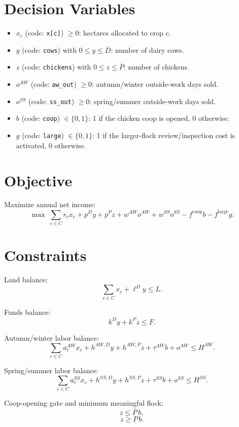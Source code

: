 \section*{Decision Variables}

\begin{itemize}
\item \(x_c\) (code: \texttt{x[c]}) \(\ge 0\): hectares allocated to crop \(c\).
\item \(y\) (code: \texttt{cows}) with \(0 \le y \le \overline D\): number of dairy cows.
\item \(z\) (code: \texttt{chickens}) with \(0 \le z \le \overline P\): number of chickens.
\item \(o^{AW}\) (code: \texttt{aw\_out}) \(\ge 0\): autumn/winter outside-work days sold.
\item \(o^{SS}\) (code: \texttt{ss\_out}) \(\ge 0\): spring/summer outside-work days sold.
\item \(b\) (code: \texttt{coop}) \(\in \{0,1\}\): 1 if the chicken coop is opened, 0 otherwise.
\item \(g\) (code: \texttt{large}) \(\in \{0,1\}\): 1 if the larger-flock review/inspection cost is activated, 0 otherwise.
\end{itemize}

\section*{Objective}

Maximize annual net income:
\[
\max \;
\sum_{c\in C} r_c x_c
+ p^D y
+ p^P z
+ w^{AW} o^{AW}
+ w^{SS} o^{SS}
- f^{\text{coop}} b
- f^{\text{large}} g .
\]

\section*{Constraints}

Land balance:
\[
\sum_{c\in C} x_c + \ell^D y \le L .
\]

Funds balance:
\[
k^D y + k^P z \le F .
\]

Autumn/winter labor balance:
\[
\sum_{c\in C} a^{AW}_c x_c
+ h^{AW,D} y
+ h^{AW,P} z
+ \tau^{AW} b
+ o^{AW}
\le H^{AW}.
\]

Spring/summer labor balance:
\[
\sum_{c\in C} a^{SS}_c x_c
+ h^{SS,D} y
+ h^{SS,P} z
+ \tau^{SS} b
+ o^{SS}
\le H^{SS}.
\]

Coop-opening gate and minimum meaningful flock:
\[
z \le \overline P\, b,
\]
\[
z \ge \underline P\, b.
\]


